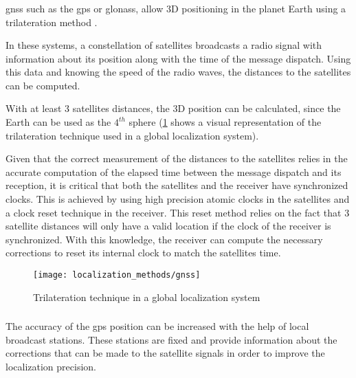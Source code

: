 \subsubsection{}

\gls{gnss} such as the \gls{gps} or \gls{glonass}, allow 3D positioning in the planet Earth  using a trilateration method \cite{Knedlik2007}.

In these systems, a constellation of satellites broadcasts a radio signal with information about its position along with the time of the message dispatch. Using this data and knowing the speed of the radio waves, the distances to the satellites can be computed.

With at least 3 satellites distances, the 3D position can be calculated, since the Earth can be used as the ${4}^{th}$ sphere (\cref{fig:localization-methods_gnss} shows a visual representation of the trilateration technique used in a global localization system).

Given that the correct measurement of the distances to the satellites relies in the accurate computation of the elapsed time between the message dispatch and its reception, it is critical that both the satellites and the receiver have synchronized clocks. This is achieved by using high precision atomic clocks in the satellites and a clock reset technique in the receiver. This reset method relies on the fact that 3 satellite distances will only have a valid location if the clock of the receiver is synchronized. With this knowledge, the receiver can compute the necessary corrections to reset its internal clock to match the satellites time.

\begin{figure}[H]
	\centering
	\texttt{[image: localization\_methods/gnss]}
	\caption[Trilateration technique in a global localization system]{Trilateration technique in a global localization system\protect\footnotemark}
	\label{fig:localization-methods_gnss}
\end{figure}


\subsubsection{}

The accuracy of the \gls{gps} position can be increased with the help of local broadcast stations. These stations are fixed and provide information about the corrections that can be made to the satellite signals in order to improve the localization precision.

